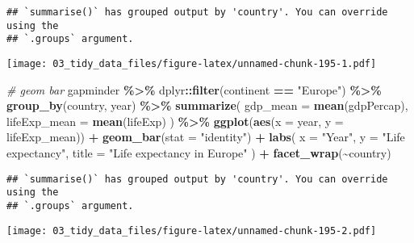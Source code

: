 \documentclass[
]{book}
\newenvironment{Shaded}{\begin{snugshade}}{\end{snugshade}}
\newcommand{\CommentTok}[1]{\textcolor[rgb]{0.56,0.35,0.01}{\textit{#1}}}
\newcommand{\DataTypeTok}[1]{\textcolor[rgb]{0.13,0.29,0.53}{#1}}
\newcommand{\KeywordTok}[1]{\textcolor[rgb]{0.13,0.29,0.53}{\textbf{#1}}}
\newcommand{\NormalTok}[1]{#1}
\newcommand{\OperatorTok}[1]{\textcolor[rgb]{0.81,0.36,0.00}{\textbf{#1}}}
\newcommand{\StringTok}[1]{\textcolor[rgb]{0.31,0.60,0.02}{#1}}
\begin{document}
\begin{verbatim}
## `summarise()` has grouped output by 'country'. You can override using the
## `.groups` argument.
\end{verbatim}

\texttt{[image: 03\_tidy\_data\_files/figure-latex/unnamed-chunk-195-1.pdf]}

\begin{Shaded}
\begin{Highlighting}[]
\CommentTok{\# geom bar}
\NormalTok{gapminder }\OperatorTok{\%\textgreater{}\%}
\StringTok{  }\NormalTok{dplyr}\OperatorTok{::}\KeywordTok{filter}\NormalTok{(continent }\OperatorTok{==}\StringTok{ "Europe"}\NormalTok{) }\OperatorTok{\%\textgreater{}\%}
\StringTok{  }\KeywordTok{group\_by}\NormalTok{(country, year) }\OperatorTok{\%\textgreater{}\%}
\StringTok{  }\KeywordTok{summarize}\NormalTok{(}
    \DataTypeTok{gdp\_mean =} \KeywordTok{mean}\NormalTok{(gdpPercap),}
    \DataTypeTok{lifeExp\_mean =} \KeywordTok{mean}\NormalTok{(lifeExp)}
\NormalTok{  ) }\OperatorTok{\%\textgreater{}\%}
\StringTok{  }\KeywordTok{ggplot}\NormalTok{(}\KeywordTok{aes}\NormalTok{(}\DataTypeTok{x =}\NormalTok{ year, }\DataTypeTok{y =}\NormalTok{ lifeExp\_mean)) }\OperatorTok{+}
\StringTok{  }\KeywordTok{geom\_bar}\NormalTok{(}\DataTypeTok{stat =} \StringTok{"identity"}\NormalTok{) }\OperatorTok{+}
\StringTok{  }\KeywordTok{labs}\NormalTok{(}
    \DataTypeTok{x =} \StringTok{"Year"}\NormalTok{,}
    \DataTypeTok{y =} \StringTok{"Life expectancy"}\NormalTok{,}
    \DataTypeTok{title =} \StringTok{"Life expectancy in Europe"}
\NormalTok{  ) }\OperatorTok{+}
\StringTok{  }\KeywordTok{facet\_wrap}\NormalTok{(}\OperatorTok{\textasciitilde{}}\NormalTok{country)}
\end{Highlighting}
\end{Shaded}

\begin{verbatim}
## `summarise()` has grouped output by 'country'. You can override using the
## `.groups` argument.
\end{verbatim}

\texttt{[image: 03\_tidy\_data\_files/figure-latex/unnamed-chunk-195-2.pdf]}
\end{document}
